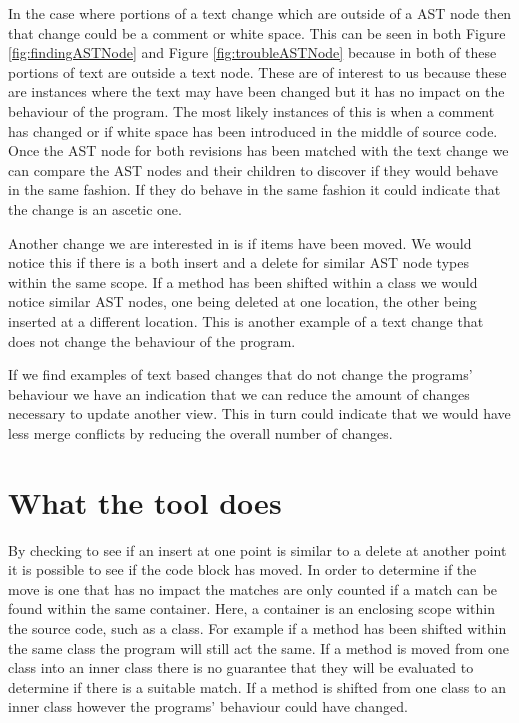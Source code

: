 In the case where portions of a text change which are outside of a AST node then that change could be a comment or white space. This can be seen in both Figure \ref{fig:findingASTNode} and Figure \ref{fig:troubleASTNode} because in both of these portions of text are outside a text node.  These are of interest to us because these are instances where the text may have been changed but it has no impact on the behaviour of the program.  The most likely instances of this is when a comment has changed or if white space has been introduced in the middle of source code. Once the AST node for both revisions has been matched with the text change we can compare the AST nodes and their children to discover if they would behave in the same fashion. If they do behave in the same fashion it could indicate that the change is an ascetic one.

Another change we are interested in is if items have been moved.  We would notice this if there is a both insert and a delete for similar AST node types within the same scope.  If a method has been shifted within a class we would notice similar AST nodes, one being deleted at one location, the other being inserted at a different location.  This is another example of a text change that does not change the behaviour of the program.


If we find examples of text based changes that do not change the programs' behaviour we have an indication that we can reduce the amount of changes necessary to update another view. This in turn could indicate that we would have less merge conflicts by reducing the overall number of changes.

% 

\section{What the tool does}

By checking to see if an insert at one point is similar to a delete at another point it is possible to see if the code block has moved. In order to determine if the move is one that has no impact the matches are only counted if a match can be found within the same container.  Here, a container is an enclosing scope within the source code, such as a class. For example if a method has been shifted within the same class the program will still act the same.  If a method is moved from one class into an inner class there is no guarantee that they will be evaluated to determine if there is a suitable match.  If a method is shifted from one class to an inner class however the programs' behaviour could have changed.

